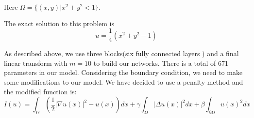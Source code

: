 \documentclass{article}
\begin{document}
Here $\Omega =\{(x,y)| x^2+y^2<1\}$.
\par The exact solution to this problem is 
\begin{equation}
u=\frac{1}{4}(x^2+y^2-1)
\end{equation}

\par As described above, we use three blocks(six fully connected layers ) and a final linear transform with $m=10$ to build our networks. There is a total of 671 parameters in our model. Considering the boundary condition, we need to make some modifications to our model. We have decided to use a penalty method and the modified function is:
\begin{equation}
I(u)=\int_{\Omega}(\frac{1}{2}|\nabla u(x)|^2-u(x))dx+\gamma\int_{\Omega}|\Delta u(x)|^2dx+\beta\int_{\partial \Omega}u(x)^2dx
\end{equation}
\end{document}
